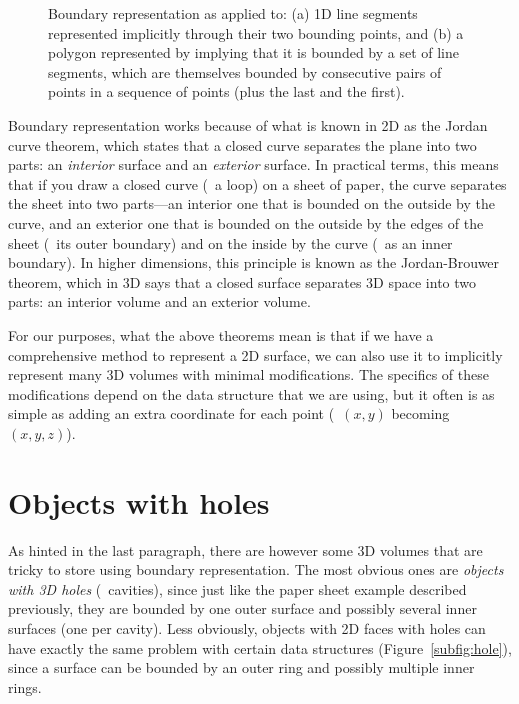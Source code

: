 \begin{figure}
\begin{subfigure}[b]{0.3\linewidth}
\caption{}%
\label{subfig:loop}
\end{subfigure}
\caption{Boundary representation as applied to: (a) 1D line segments represented implicitly through their two bounding points, and (b) a polygon represented by implying that it is bounded by a set of line segments, which are themselves bounded by consecutive pairs of points in a sequence of points (plus the last and the first).}%
\label{fig:brep}
\end{figure}

Boundary representation works because of what is known in 2D as the Jordan curve theorem, which states that a closed curve separates the plane into two parts: an \emph{interior} surface and an \emph{exterior} surface.
In practical terms, this means that if you draw a closed curve (\ie\ a loop) on a sheet of paper, the curve separates the sheet into two parts---an interior one that is bounded on the outside by the curve, and an exterior one that is bounded on the outside by the edges of the sheet (\ie\ its outer boundary) and on the inside by the curve (\ie\ as an inner boundary).
In higher dimensions, this principle is known as the Jordan-Brouwer theorem, which in 3D says that a closed surface separates 3D space into two parts: an interior volume and an exterior volume.

For our purposes, what the above theorems mean is that if we have a comprehensive method to represent a 2D surface, we can also use it to implicitly represent many 3D volumes with minimal modifications.
The specifics of these modifications depend on the data structure that we are using, but it often is as simple as adding an extra coordinate for each point (\ie\ $(x, y)$ becoming $(x, y, z)$).

\section{Objects with holes}

As hinted in the last paragraph, there are however some 3D volumes that are tricky to store using boundary representation.
The most obvious ones are \emph{objects with 3D holes} (\ie\ cavities), since just like the paper sheet example described previously, they are bounded by one outer surface and possibly several inner surfaces (one per cavity).
Less obviously, objects with 2D faces with holes can have exactly the same problem with certain data structures (Figure~\ref{subfig:hole}), since a surface can be bounded by an outer ring and possibly multiple inner rings.

